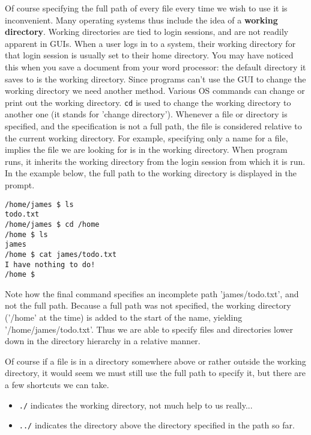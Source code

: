 \documentclass[a4paper,11pt]{article}
\begin{document}
Of course specifying the full path of every file every time we wish   to use it is inconvenient. Many operating systems thus include the idea   of a \textbf{working directory}. Working directories are tied   to login sessions, and are not readily apparent in GUIs. When a user   logs in to a system, their working directory for that login session is   usually set to their home directory. You may have noticed this when you save a document from your word processor: the default directory it saves to is the working directory. Since programs can't use the GUI to change the working directory we need another method. Various OS commands can change or   print out the working directory. 
\texttt{cd} is used to change the   working directory to another one (it stands for 'change directory').  Whenever a file or directory is   specified, and the specification is not a full path, the file is   considered relative to the current working directory. For example,   specifying only a name for a file, implies the file we are looking for   is in the working directory. When program runs, it inherits the working   directory from the login session from which it is run. In the example   below, the full path to the working directory is displayed in the   prompt.
\begin{lstlisting}
/home/james $ ls
todo.txt
/home/james $ cd /home
/home $ ls
james
/home $ cat james/todo.txt
I have nothing to do!
/home $ \end{lstlisting}

Note how the final command specifies an incomplete path   'james/todo.txt', and not the full path. Because a full path was not   specified, the working directory ('/home' at the time) is added to the start of   the name, yielding '/home/james/todo.txt'. Thus we are able to specify   files and directories lower down in the directory hierarchy in a   relative manner.

Of course if a file is in a directory somewhere above or rather   outside the working directory, it would seem we must still use the full   path to specify it, but there are a few shortcuts we can take.
\begin{itemize}
	\item 
\texttt{./} indicates the working directory, not much help to us really...
	\item 
\texttt{../} indicates the directory above the directory specified in the path so far.
\end{itemize}
\end{document}
